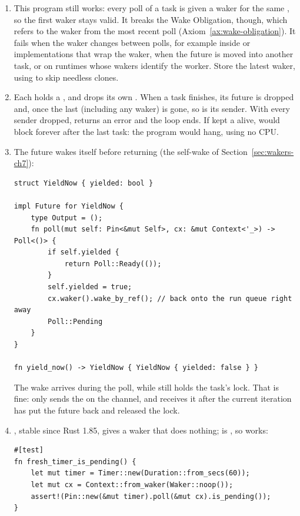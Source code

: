\begin{Answer}
    \begin{enumerate}
        \item This program still works: every poll of a task is given a waker for the same , so the first waker stays valid. It breaks the Wake Obligation, though, which refers to the waker from the most recent poll (Axiom~\ref{ax:wake-obligation}). It fails when the waker changes between polls, for example inside  or  implementations that wrap the waker, when the future is moved into another task, or on runtimes whose wakers identify the worker. Store the latest waker, using  to skip needless clones.
        \item Each  holds a , and  drops its own . When a task finishes, its future is dropped and, once the last  (including any waker) is gone, so is its sender. With every sender dropped,  returns an error and the loop ends. If  kept a  alive,  would block forever after the last task: the program would hang, using no CPU.
        \item The future wakes itself before returning  (the self-wake of Section~\ref{sec:wakers-ch7}):
\begin{lstlisting}
struct YieldNow { yielded: bool }

impl Future for YieldNow {
    type Output = ();
    fn poll(mut self: Pin<&mut Self>, cx: &mut Context<'_>) -> Poll<()> {
        if self.yielded {
            return Poll::Ready(());
        }
        self.yielded = true;
        cx.waker().wake_by_ref(); // back onto the run queue right away
        Poll::Pending
    }
}

fn yield_now() -> YieldNow { YieldNow { yielded: false } }
\end{lstlisting}
        The wake arrives during the poll, while  still holds the task's  lock. That is fine:  only sends the  on the channel, and  receives it after the current iteration has put the future back and released the lock.
        \item {}, stable since Rust 1.85, gives a waker that does nothing;  is , so  works:
\begin{lstlisting}
#[test]
fn fresh_timer_is_pending() {
    let mut timer = Timer::new(Duration::from_secs(60));
    let mut cx = Context::from_waker(Waker::noop());
    assert!(Pin::new(&mut timer).poll(&mut cx).is_pending());
}
\end{lstlisting}
    \end{enumerate}
\end{Answer}

